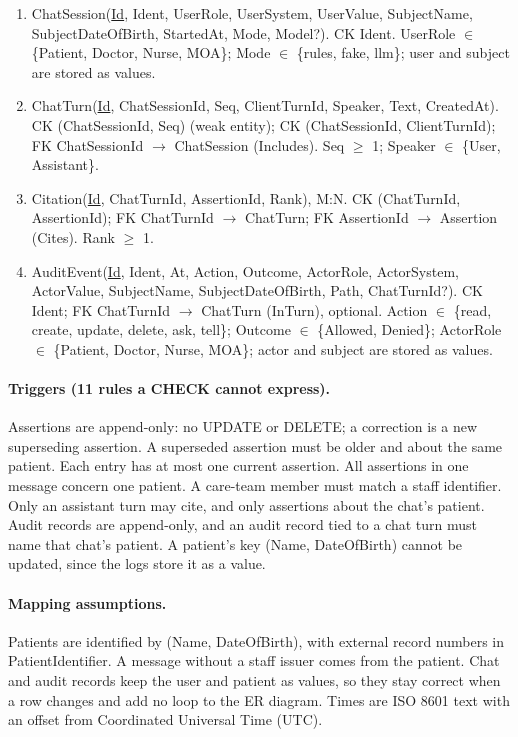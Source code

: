 \documentclass[sigconf]{acmart}
\begin{document}
\begin{enumerate}
\item ChatSession(\underline{Id}, Ident, UserRole, UserSystem, UserValue, SubjectName, SubjectDateOfBirth, StartedAt, Mode, Model?). CK Ident. UserRole $\in$ \{Patient, Doctor, Nurse, MOA\}; Mode $\in$ \{rules, fake, llm\}; user and subject are stored as values.
\item ChatTurn(\underline{Id}, ChatSessionId, Seq, ClientTurnId, Speaker, Text, CreatedAt). CK (ChatSessionId, Seq) (weak entity); CK (ChatSessionId, ClientTurnId); FK ChatSessionId $\to$ ChatSession (Includes). Seq $\ge$ 1; Speaker $\in$ \{User, Assistant\}.
\item Citation(\underline{Id}, ChatTurnId, AssertionId, Rank), M:N. CK (ChatTurnId, AssertionId); FK ChatTurnId $\to$ ChatTurn; FK AssertionId $\to$ Assertion (Cites). Rank $\ge$ 1.
\item AuditEvent(\underline{Id}, Ident, At, Action, Outcome, ActorRole, ActorSystem, ActorValue, SubjectName, SubjectDateOfBirth, Path, ChatTurnId?). CK Ident; FK ChatTurnId $\to$ ChatTurn (InTurn), optional. Action $\in$ \{read, create, update, delete, ask, tell\}; Outcome $\in$ \{Allowed, Denied\}; ActorRole $\in$ \{Patient, Doctor, Nurse, MOA\}; actor and subject are stored as values.
\end{enumerate}
\paragraph{Triggers (11 rules a CHECK cannot express).} Assertions are append-only: no UPDATE or DELETE; a correction is a new superseding assertion. A superseded assertion must be older and about the same patient. Each entry has at most one current assertion. All assertions in one message concern one patient. A care-team member must match a staff identifier. Only an assistant turn may cite, and only assertions about the chat's patient. Audit records are append-only, and an audit record tied to a chat turn must name that chat's patient. A patient's key (Name, DateOfBirth) cannot be updated, since the logs store it as a value.
\paragraph{Mapping assumptions.} Patients are identified by (Name, DateOfBirth), with external record numbers in PatientIdentifier. A message without a staff issuer comes from the patient. Chat and audit records keep the user and patient as values, so they stay correct when a row changes and add no loop to the ER diagram. Times are ISO 8601 text with an offset from Coordinated Universal Time (UTC).
\end{document}
